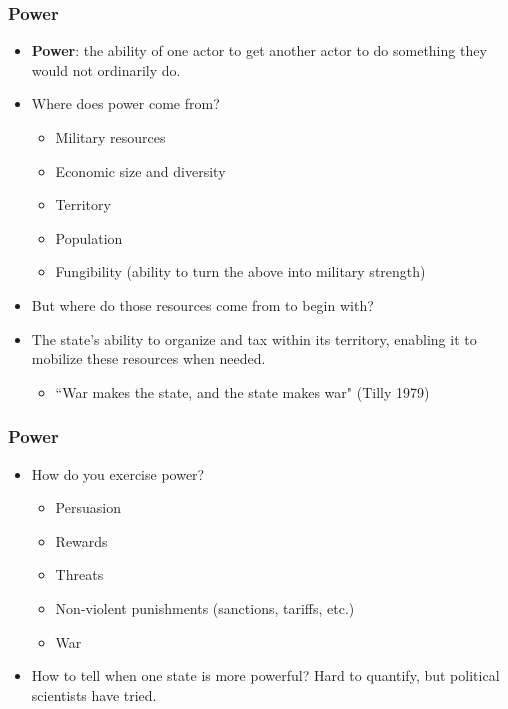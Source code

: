 \documentclass[handout]{beamer}
\begin{document}
\begin{frame} 
\frametitle{\LARGE{Power}}
\begin{itemize}
    \item \textbf{Power}: the ability of one actor to get another actor to do something they would not ordinarily do. \pause
    \item Where does power come from? \pause
    \begin{itemize}
        \item Military resources \pause
        \item Economic size and diversity \pause
        \item Territory \pause
        \item Population \pause
        \item Fungibility (ability to turn the above into military strength) \pause
    \end{itemize}
    \item But where do those resources come from to begin with? \pause
    \item The state's ability to organize and tax within its territory, enabling it to mobilize these resources when needed.
    \begin{itemize}
    	\item ``War makes the state, and the state makes war" (Tilly 1979)
    \end{itemize}
\end{itemize}
\end{frame}

\begin{frame} 
\frametitle{\LARGE{Power}}
\begin{itemize}
    \item How do you exercise power? \pause
    \begin{itemize}
        \item Persuasion \pause
        \item Rewards \pause
        \item Threats \pause
        \item Non-violent punishments (sanctions, tariffs, etc.) \pause
        \item War \pause
    \end{itemize}
    \item How to tell when one state is more powerful? Hard to quantify, but political scientists have tried.
\end{itemize}
\end{frame}
\end{document}
